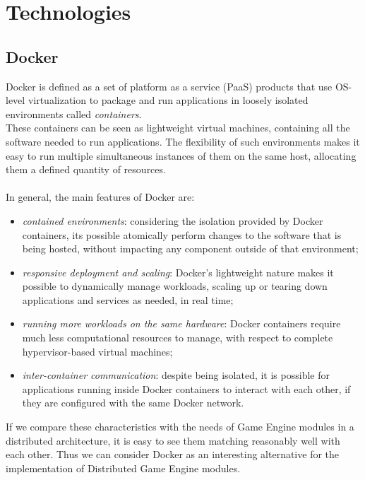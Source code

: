 
\chapter{Technologies}
\label{cap:technologies}

\section{Docker}
Docker is defined as a set of platform as a service (PaaS) products that use OS-level virtualization to package and run applications in loosely isolated environments called \textit{containers}. \\
These containers can be seen as lightweight virtual machines, containing all the software needed to run applications. The flexibility of such environments makes it easy to run multiple simultaneous instances of them on the same host, allocating them a defined quantity of resources. \\ \\
In general, the main features of Docker are:
\begin{itemize}
	\item \textit{contained environments}: considering the isolation provided by Docker containers, its possible atomically perform changes to the software that is being hosted, without impacting any component outside of that environment;
	\item \textit{responsive deployment and scaling}: Docker's lightweight nature makes it possible to dynamically manage workloads, scaling up or tearing down applications and services as needed, in real time;
	\item \textit{running more workloads on the same hardware}: Docker containers require much less computational resources to manage, with respect to complete hypervisor-based virtual machines;
	\item \textit{inter-container communication}: despite being isolated, it is possible for applications running inside Docker containers to interact with each other, if they are configured with the same Docker network.
\end{itemize}
If we compare these characteristics with the needs of Game Engine modules in a distributed architecture, it is easy to see them matching reasonably well with each other. Thus we can consider Docker as an interesting alternative for the implementation of Distributed Game Engine modules.

